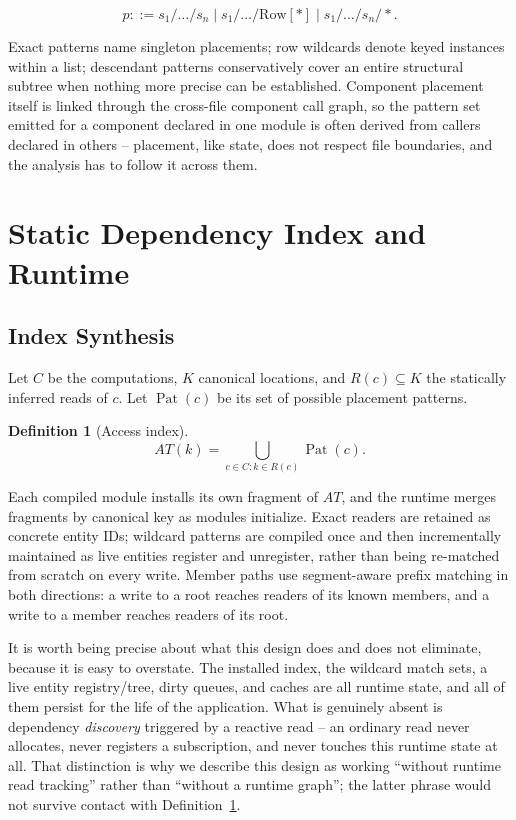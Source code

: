 \documentclass[conference]{IEEEtran}
\newtheorem{definition}{Definition}
\begin{document}
\[
p ::= s_1/\dots/s_n
  \mid s_1/\dots/\mathrm{Row}[*]
  \mid s_1/\dots/s_n/*.
\]

Exact patterns name singleton placements; row wildcards denote keyed
instances within a list; descendant patterns conservatively cover an entire
structural subtree when nothing more precise can be established. Component
placement itself is linked through the cross-file component call graph, so
the pattern set emitted for a component declared in one module is often
derived from callers declared in others -- placement, like state, does not
respect file boundaries, and the analysis has to follow it across them.

\section{Static Dependency Index and Runtime}
\label{sec:runtime}

\subsection{Index Synthesis}

Let $C$ be the computations, $K$ canonical locations, and $R(c)\subseteq K$
the statically inferred reads of $c$. Let $\operatorname{Pat}(c)$ be its set
of possible placement patterns.

\begin{definition}[Access index]
\label{def:index}
\[
AT(k)=\bigcup_{c\in C:k\in R(c)}\operatorname{Pat}(c).
\]
\end{definition}

Each compiled module installs its own fragment of $AT$, and the runtime
merges fragments by canonical key as modules initialize. Exact readers are
retained as concrete entity IDs; wildcard patterns are compiled once and then
incrementally maintained as live entities register and unregister, rather
than being re-matched from scratch on every write. Member paths use
segment-aware prefix matching in both directions: a write to a root reaches
readers of its known members, and a write to a member reaches readers of its
root.

It is worth being precise about what this design does and does not eliminate,
because it is easy to overstate. The installed index, the wildcard match
sets, a live entity registry/tree, dirty queues, and caches are all runtime
state, and all of them persist for the life of the application. What is
genuinely absent is dependency \emph{discovery} triggered by a reactive read
-- an ordinary read never allocates, never registers a subscription, and
never touches this runtime state at all. That distinction is why we describe
this design as working ``without runtime read tracking'' rather than
``without a runtime graph''; the latter phrase would not survive contact with
Definition~\ref{def:index}.
\end{document}
